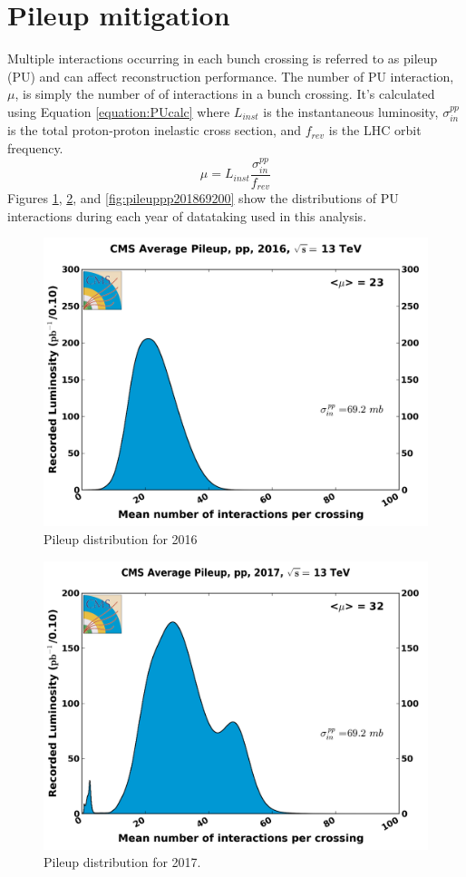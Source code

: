 \label{section:MET}

\section{Pileup mitigation}

Multiple interactions occurring in each bunch crossing is referred to as pileup (PU) and can affect reconstruction performance.  The number of PU interaction, $\mu$, is simply the number of of interactions in a bunch crossing.  It's calculated using Equation \ref{equation:PUcalc} where $L_{inst}$ is the instantaneous luminosity, $\sigma_{in}^{pp}$ is the total proton-proton inelastic cross section, and $f_{rev}$ is the LHC orbit frequency.  
\begin{equation}
	\mu = L_{inst}\frac{\sigma_{in}^{pp}}{f_{rev}}
	\label{equation:PUcalc}
\end{equation}
Figures \ref{fig:pileuppp201669200}, \ref{fig:pileuppp201769200}, and \ref{fig:pileuppp201869200} show the distributions of PU interactions during each year of datataking used in this analysis.
\begin{figure}[h]
	\centering
	\includegraphics[width=0.9\linewidth]{Figures/pileup_pp_2016_69200}
	\caption[Pileup distribution for 2016.]{Pileup distribution for 2016}
	\label{fig:pileuppp201669200}
\end{figure}
\begin{figure}[h]
	\centering
	\includegraphics[width=0.9\linewidth]{Figures/pileup_pp_2017_69200}
	\caption[Pileup distribution for 2017]{Pileup distribution for 2017.}
	\label{fig:pileuppp201769200}
\end{figure}
